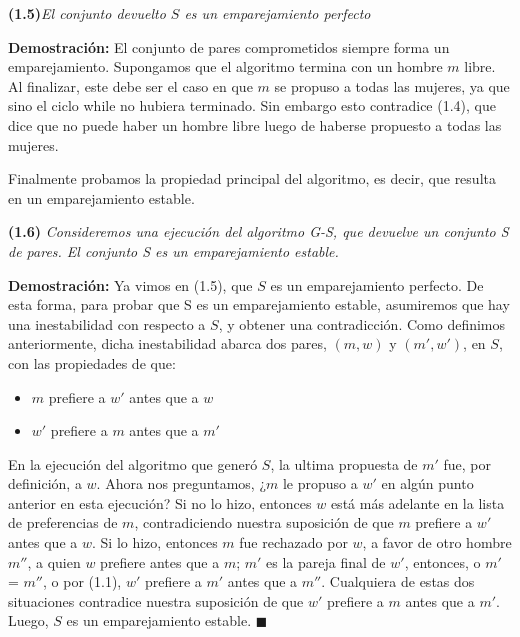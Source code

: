 \documentclass[a4paper, 12pt]{book}
\begin{document}
\vspace{0.2cm}\noindent
\textbf{(1.5)}\textit{El conjunto devuelto $S$ es un emparejamiento 	 perfecto}
\vspace{0.2cm}

\textbf{Demostración:} El conjunto de pares comprometidos siempre forma un emparejamiento. Supongamos que el algoritmo termina con un hombre $m$ libre. Al finalizar, este debe ser el caso en que $m$ se propuso a todas las mujeres, ya que sino el ciclo while no hubiera terminado. Sin embargo esto contradice (1.4), que dice que no puede haber un hombre libre luego de haberse propuesto a todas las mujeres.

Finalmente probamos la propiedad principal del algoritmo, es decir, que resulta en un emparejamiento estable.

\vspace{0.2cm}\noindent
\colorbox{mygray}{\parbox{0.98\textwidth}{
\textbf{(1.6)} \textit{ Consideremos una ejecución del algoritmo G-S, que devuelve un conjunto S de pares. El conjunto S es un emparejamiento estable.}}}
\vspace{0.2cm}

\textbf{Demostración:} Ya vimos en (1.5), que $S$ es un emparejamiento perfecto. De esta forma, para probar que S es un emparejamiento estable, asumiremos que hay una inestabilidad con respecto a $S$, y obtener una contradicción. Como definimos anteriormente, dicha inestabilidad abarca dos pares, $(m,w)$ y $(m',w')$, en $S$, con las propiedades de que:

\begin{itemize}
    \item $m$ prefiere a $w'$ antes que a $w$ 
    \item $w'$ prefiere a $m$ antes que a $m'$
\end{itemize}
    
En la ejecución del algoritmo que generó $S$, la ultima propuesta de $m'$ fue, por definición, a $w$. Ahora nos preguntamos, ¿$m$ le propuso a $w'$ en algún punto anterior en esta ejecución? Si no lo hizo, entonces $w$ está más adelante en la lista de preferencias de $m$, contradiciendo nuestra suposición de que $m$ prefiere a $w'$ antes que a $w$. Si lo hizo, entonces $m$ fue rechazado por $w$, a favor de otro hombre $m''$, a quien $w$ prefiere antes que a $m$; $m'$ es la pareja final de $w'$, entonces, o $m'$ = $m''$, o por (1.1), $w'$ prefiere a $m'$ antes que a $m''$. Cualquiera de estas dos situaciones contradice nuestra suposición de que $w'$ prefiere a $m$ antes que a $m'$. Luego, $S$ es un emparejamiento estable. $\blacksquare$ 
\end{document}
